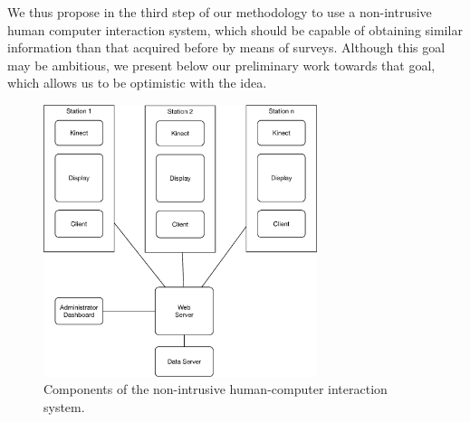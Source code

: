 \documentclass[graybox]{svmult}
\begin{document}
We thus propose in the third step of our methodology to use a non-intrusive human computer interaction system, which should be capable of obtaining similar information than that acquired before by means of surveys.  Although this goal may be ambitious, we present below our preliminary work towards that goal, which allows us to be optimistic with the idea.  





\begin{figure}[t]
\centering 
\includegraphics[width=8cm]{img/components.eps}
\caption{ Components of the non-intrusive human-computer interaction system.}
\label{fig:components}       %
\end{figure}
\end{document}
